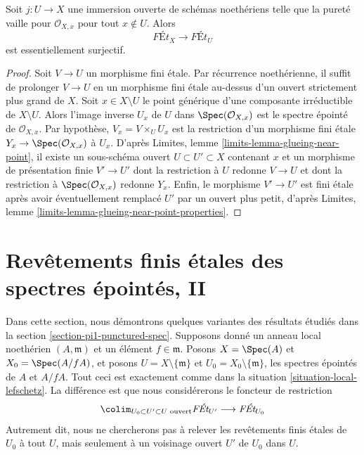 \begin{lemma}
\label{lemma-extend-pure}
Soit $j : U \to X$ une immersion ouverte de schémas noethériens
telle que la pureté vaille pour $\mathcal{O}_{X, x}$ pour tout $x \not \in U$.
Alors
$$
\textit{F\'Et}_X \longrightarrow \textit{F\'Et}_U
$$
est essentiellement surjectif.
\end{lemma}

\begin{proof}
Soit $V \to U$ un morphisme fini étale. Par récurrence noethérienne,
il suffit de prolonger $V \to U$ en un morphisme fini étale
au-dessus d'un ouvert strictement plus grand de $X$.
Soit $x \in X \setminus U$ le point générique d'une
composante irréductible de $X \setminus U$.
Alors l'image inverse $U_x$ de $U$ dans $\Spec(\mathcal{O}_{X, x})$
est le spectre épointé de $\mathcal{O}_{X, x}$.
Par hypothèse, $V_x = V \times_U U_x$ est la restriction
d'un morphisme fini étale $Y_x \to \Spec(\mathcal{O}_{X, x})$
à $U_x$.
D'après Limites, lemme \ref{limits-lemma-glueing-near-point},
il existe un sous-schéma ouvert $U \subset U' \subset X$
contenant $x$ et un morphisme de présentation finie $V' \to U'$
dont la restriction à $U$ redonne $V \to U$ et
dont la restriction à $\Spec(\mathcal{O}_{X, x})$ redonne $Y_x$.
Enfin, le morphisme $V' \to U'$ est fini étale
après avoir éventuellement remplacé $U'$ par un ouvert plus petit, d'après
Limites, lemme \ref{limits-lemma-glueing-near-point-properties}.
\end{proof}
















\section{Revêtements finis étales des spectres épointés, II}
\label{section-pi1-punctured-spec-II}

\noindent
Dans cette section, nous démontrons quelques variantes des résultats étudiés
dans la section \ref{section-pi1-punctured-spec}. Supposons
donné un anneau local noethérien $(A, \mathfrak m)$ et un élément $f \in \mathfrak m$.
Posons $X = \Spec(A)$ et $X_0 = \Spec(A/fA)$, et
posons $U = X \setminus \{\mathfrak m\}$ et
$U_0 = X_0 \setminus \{\mathfrak m\}$, les spectres épointés de
$A$ et $A/fA$. Tout ceci est exactement comme dans la
situation \ref{situation-local-lefschetz}.
La différence est que nous considérerons le foncteur de restriction
$$
\colim_{U_0 \subset U' \subset U\text{ ouvert}} \textit{F\'Et}_{U'}
\longrightarrow
\textit{F\'Et}_{U_0}
$$
Autrement dit, nous ne chercherons pas à relever les revêtements finis étales
de $U_0$ à tout $U$, mais seulement à un voisinage ouvert
$U'$ de $U_0$ dans $U$.

